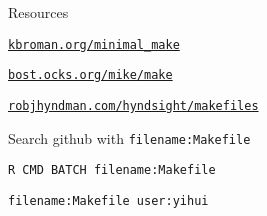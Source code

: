 \documentclass[12pt,t]{beamer}
\begin{document}
\begin{frame}[fragile]{Resources}


  \bbi
  \item \href{https://kbroman.org/minimal_make}{\color{white} \tt kbroman.org/minimal\_make}
  \item \href{https://bost.ocks.org/mike/make/}{\color{white} \tt bost.ocks.org/mike/make}
  \item \href{https://robjhyndman.com/hyndsight/makefiles/}{\color{white} \tt robjhyndman.com/hyndsight/makefiles}
  \item Search github with {\tt filename:Makefile}

    \bi
    \item {\color{hilit} \verb|R CMD BATCH filename:Makefile|}

    \item {\color{hilit} \verb|filename:Makefile user:yihui|}
     \ei

  \ei


\end{frame}
\end{document}
